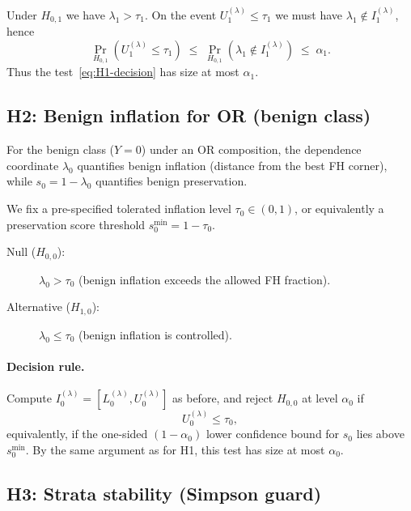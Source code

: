 \begin{remark}
Under $H_{0,1}$ we have $\lambda_1 > \tau_1$.
On the event $U_1^{(\lambda)} \le \tau_1$ we must have
$\lambda_1 \notin I_1^{(\lambda)}$, hence
\[
  \Pr_{H_{0,1}}(U_1^{(\lambda)} \le \tau_1)
  \;\le\;
  \Pr_{H_{0,1}}(\lambda_1 \notin I_1^{(\lambda)})
  \;\le\; \alpha_1.
\]
Thus the test~\eqref{eq:H1-decision} has size at most $\alpha_1$.
\end{remark}

\subsection{H2: Benign inflation for OR (benign class)}

For the benign class ($Y=0$) under an OR composition, the dependence
coordinate $\lambda_0$ quantifies benign inflation (distance from the
best FH corner), while $s_0 = 1-\lambda_0$ quantifies benign
preservation.

We fix a pre-specified tolerated inflation level $\tau_0 \in (0,1)$,
or equivalently a preservation score threshold
$s_0^{\min} = 1-\tau_0$.

\begin{hypothesis}
\label{hyp:H2}
\mbox{}
\begin{description}
  \item[Null ($H_{0,0}$):]
    $\lambda_0 > \tau_0$ \quad
    (benign inflation exceeds the allowed FH fraction).
  \item[Alternative ($H_{1,0}$):]
    $\lambda_0 \le \tau_0$ \quad
    (benign inflation is controlled).
\end{description}
\end{hypothesis}

\paragraph{Decision rule.}
Compute $I_0^{(\lambda)} = [L_0^{(\lambda)}, U_0^{(\lambda)}]$ as
before, and reject $H_{0,0}$ at level $\alpha_0$ if
\begin{equation}
  U_0^{(\lambda)} \le \tau_0,
  \label{eq:H2-decision}
\end{equation}
equivalently, if the one-sided $(1-\alpha_0)$ lower confidence bound
for $s_0$ lies above $s_0^{\min}$.
By the same argument as for H1, this test has size at most $\alpha_0$.

\subsection{H3: Strata stability (Simpson guard)}

